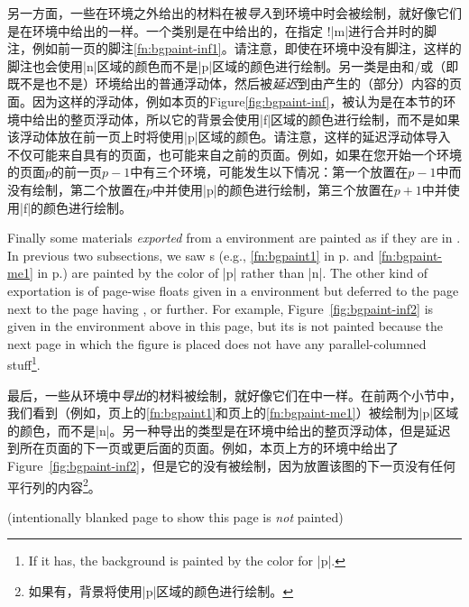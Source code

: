 另一方面，一些在环境之外给出的材料在被\emph{导入}到环境中时会被绘制，就好像它们是在环境中给出的一样。一个类别是在\preenv{}中给出的，在指定 \!\footnotelayout!|{m}|进行合并时的脚注，例如前一页的脚注\ref{fn:bgpaint-inf1}。请注意，即使在环境中没有脚注，这样的脚注也会使用|n|区域的颜色而不是|p|区域的颜色进行绘制。另一类是由和/或（即既不是也不是）环境给出的普通浮动体，然后被\emph{延迟}到由产生的（部分）内容的页面。因为这样的浮动体，例如本页的Figure\Tie\ref{fig:bgpaint-inf}，被认为是在本节的环境中给出的整页浮动体，所以它的背景会使用|f|区域的颜色进行绘制，而不是如果该浮动体放在前一页上时将使用|p|区域的颜色。请注意，这样的延迟浮动体导入不仅可能来自具有\beginparacol{}的页面，也可能来自之前的页面。例如，如果在您开始一个环境的页面$p$的前一页$p-1$中有三个环境，可能发生以下情况：第一个放置在$p-1$中而没有绘制，第二个放置在$p$中并使用|p|的颜色进行绘制，第三个放置在$p+1$中并使用|f|的颜色进行绘制。


Finally some materials \emph{exported} from a  environment
are painted as if they are in \postenv.  In previous two subsections, we
saw \Mgfnote{}s (e.g., \ref{fn:bgpaint1} in p.\Tie\pageref{fn:bgpaint1}
and \ref{fn:bgpaint-me1} in p.\Tie\pageref{fn:bgpaint-me1}) are painted by
the color of |p| rather than |n|.  The other kind of exportation is of
page-wise floats given in a  environment but deferred to the
page next to the page having \Endparacol, or further.  For example,
Figure~\ref{fig:bgpaint-inf2} is given in the  environment
above in this page, but its \bground{} is not painted because the next page
in which the figure is placed does not have any parallel-columned
stuff\footnote{%
If it has, the background is painted by the color for |p|.}.

最后，一些从环境中\emph{导出}的材料被绘制，就好像它们在\postenv{}中一样。在前两个小节中，我们看到\Mgfnote{}（例如，\pageref{fn:bgpaint1}页上的\ref{fn:bgpaint1}和\pageref{fn:bgpaint-me1}页上的\ref{fn:bgpaint-me1}）被绘制为|p|区域的颜色，而不是|n|。另一种导出的类型是在环境中给出的整页浮动体，但是延迟到\Endparacol{}所在页面的下一页或更后面的页面。例如，本页上方的环境中给出了Figure~\ref{fig:bgpaint-inf2}，但是它的\bground{}没有被绘制，因为放置该图的下一页没有任何平行列的内容\footnote{如果有，背景将使用|p|区域的颜色进行绘制。}。

\newpage\vspace*{\fill}
\centerline{(intentionally blanked page to show this page is \emph{not}
painted)}
\vfill
\advance\skip\footins-4pt\relax
